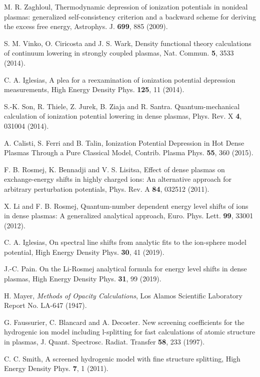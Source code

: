 \documentclass[a4paper,10pt]{article}
\begin{document}
\begin{thebibliography}{99}
M. R. Zaghloul, Thermodynamic depression of ionization potentials in nonideal plasmas: generalized self-consistency criterion and a backward scheme for deriving the excess free energy, Astrophys. J. {\bf 699}, 885 (2009).

S. M. Vinko, O. Ciricosta and J. S. Wark, Density functional theory calculations of continuum lowering in strongly coupled plasmas, Nat. Commun. {\bf 5}, 3533 (2014).

C. A. Iglesias, A plea for a reexamination of ionization potential depression measurements, High Energy Density Phys. {\bf 125}, 11 (2014).

S.-K. Son, R. Thiele, Z. Jurek, B. Ziaja and R. Santra. Quantum-mechanical calculation of ionization potential lowering in dense plasmas, Phys. Rev. X {\bf 4}, 031004 (2014). 

A. Calisti, S. Ferri and B. Talin, Ionization Potential Depression in Hot Dense Plasmas Through a Pure Classical Model, Contrib. Plasma Phys. {\bf 55}, 360 (2015).

F. B. Rosmej, K. Bennadji and V. S. Lisitsa, Effect of dense plasmas on exchange-energy shifts in highly charged ions: An alternative approach for arbitrary perturbation potentials, Phys. Rev. A {\bf 84}, 032512 (2011).

X. Li and F. B. Rosmej, Quantum-number dependent energy level shifts of ions in dense plasmas: A generalized analytical approach, Euro. Phys. Lett. {\bf 99}, 33001 (2012).

C. A. Iglesias, On spectral line shifts from analytic fits to the ion-sphere model potential, High Energy Density Phys. {\bf 30}, 41 (2019).

J.-C. Pain. On the Li-Rosmej analytical formula for energy level shifts in dense plasmas, High Energy Density Phys. {\bf 31}, 99 (2019).

H. Mayer, {\it Methods of Opacity Calculations}, Los Alamos Scientific Laboratory Report No. LA-647 (1947).

G. Faussurier, C. Blancard and A. Decoster. New screening coefficients for the hydrogenic ion model including l-splitting for fast calculations of atomic structure in plasmas, J. Quant. Spectrosc. Radiat. Transfer {\bf 58}, 233 (1997). %

C. C. Smith, A screened hydrogenic model with fine structure splitting, High Energy Density Phys. {\bf 7}, 1 (2011). %


\end{thebibliography}
\end{document}
